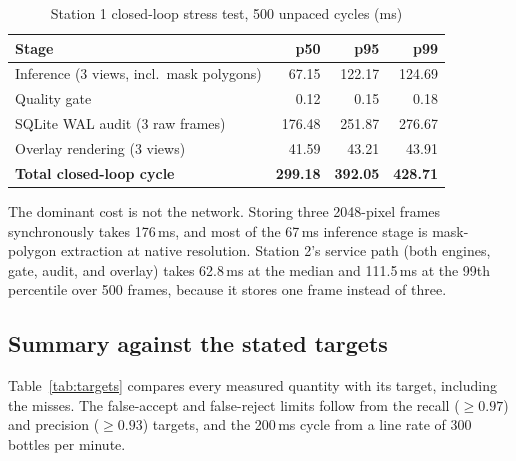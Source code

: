 \begin{table}[htbp]
\centering
\caption{Station 1 closed-loop stress test, 500 unpaced cycles (ms)}
\label{tab:stress}
\begin{tabular}{|l|r|r|r|}
\hline
\textbf{Stage} & \textbf{p50} & \textbf{p95} & \textbf{p99} \\ \hline
Inference (3 views, incl.\ mask polygons) & 67.15 & 122.17 & 124.69 \\ \hline
Quality gate & 0.12 & 0.15 & 0.18 \\ \hline
SQLite WAL audit (3 raw frames) & 176.48 & 251.87 & 276.67 \\ \hline
Overlay rendering (3 views) & 41.59 & 43.21 & 43.91 \\ \hline
\textbf{Total closed-loop cycle} & \textbf{299.18} & \textbf{392.05} & \textbf{428.71} \\ \hline
\end{tabular}
\end{table}

The dominant cost is not the network. Storing three 2048-pixel frames synchronously takes 176\,ms, and most of the 67\,ms inference stage is mask-polygon extraction at native resolution. Station 2's service path (both engines, gate, audit, and overlay) takes 62.8\,ms at the median and 111.5\,ms at the 99th percentile over 500 frames, because it stores one frame instead of three.

\subsection{Summary against the stated targets}
\label{sec:targets}
Table~\ref{tab:targets} compares every measured quantity with its target, including the misses. The false-accept and false-reject limits follow from the recall ($\geq0.97$) and precision ($\geq0.93$) targets, and the 200\,ms cycle from a line rate of 300 bottles per minute.

